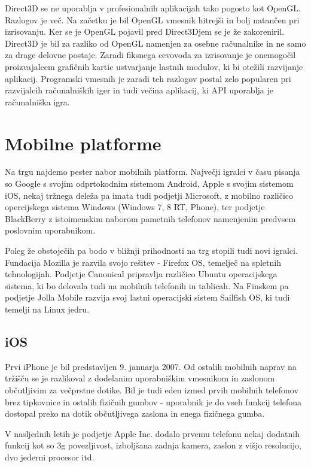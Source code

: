 Direct3D se ne uporablja v profesionalnih aplikacijah tako pogosto kot OpenGL. Razlogov je več. Na začetku je bil OpenGL vmesnik hitrejši in bolj natančen pri izrisovanju. Ker se je OpenGL pojavil pred Direct3Djem se je že zakoreniril. Direct3D je bil za razliko od OpenGL namenjen za osebne računalnike in ne samo za drage delovne postaje. Zaradi fiksnega cevovoda za izrisovanje je onemogočil proizvajalcem grafičnih kartic ustvarjanje lastnih modulov, ki bi otežili razvijanje aplikacij. Programski vmesnih je zaradi teh razlogov postal zelo popularen pri razvijalcih računalniških iger in tudi večina aplikacij, ki API uporablja je računalniška igra.

\section{Mobilne platforme} 

Na trgu najdemo pester nabor mobilnih platform. Največji igralci v času pisanja so Google s svojim odprtokodnim sistemom Android, Apple s svojim sistemom iOS, nekaj tržnega deleža pa imata tudi podjetji Microsoft, z mobilno različico opercijskega sistema Windows (Windows 7, 8 RT, Phone), ter podjetje BlackBerry z istoimenskim naborom pametnih telefonov namenjenim predvsem poslovnim uporabnikom.

Poleg že obstoječih pa bodo v bližnji prihodnosti na trg stopili tudi novi igralci. Fundacija Mozilla je  razvila svojo rešitev - Firefox OS, temelječ na spletnih tehnologijah. Podjetje Canonical pripravlja različico Ubuntu operacijskega sistema, ki bo delovala tudi na mobilnih telefonih in tablicah. Na Finskem pa podjetje Jolla Mobile razvija svoj lastni operacijski sistem Sailfish OS, ki tudi temelji na Linux jedru.

\subsection{iOS}

Prvi iPhone je bil predstavljen 9. januarja 2007. Od ostalih mobilnih naprav na tržišču se je razlikoval z dodelanim uporabniškim vmesnikom in zaslonom občutljivim za večprstne dotike. Bil je tudi eden izmed prvih mobilnih telefonov brez tipkovnice in ostalih fizičnih gumbov - uporabnik je do vseh funkcij telefona dostopal preko na dotik občutljivega zaslona in enega fizičnega gumba.

V nasljednih letih je podjetje Apple Inc. dodalo prvemu telefonu nekaj dodatnih funkcij kot so 3g povezljivost, izboljšana zadnja kamera, zaslon z višjo resolucijo, dvo jederni procesor itd.

